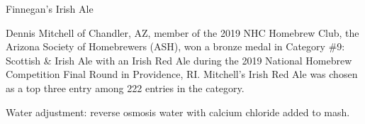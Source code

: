 \stylesection{\styleirishredale}

\begin{recipie}{Finnegan's Irish Ale}

\begin{aboutblock}
Dennis Mitchell of Chandler, AZ, member of the 2019 NHC Homebrew Club, the Arizona
Society of Homebrewers (ASH), won a bronze medal in Category \#9: Scottish \& Irish
Ale with an Irish Red Ale during the 2019 National Homebrew Competition Final Round
in Providence, RI. Mitchell's Irish Red Ale was chosen as a top three entry among
222 entries in the category. \sourceaha
\end{aboutblock}


\begin{methodandtiming}
 
\begin{mashsteps}
\end{mashsteps}

\begin{fermentationsteps}
\end{fermentationsteps}

\begin{directions}
Water adjustment: reverse osmosis water with  calcium chloride added to
mash.
\end{directions}

\end{methodandtiming}

\pagebreak

\begin{ingredientsblock}

\begin{malts}
\end{malts}

\begin{hops}
\end{hops}


\end{ingredientsblock}

\end{recipie}

